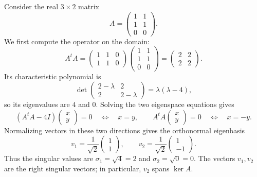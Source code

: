 \begin{example}
Consider the real \(3\times2\) matrix
\[
A=\begin{pmatrix}1&1\\1&1\\0&0\end{pmatrix}.
\]
We first compute the operator on the domain:
\[
A^tA
=\begin{pmatrix}1&1&0\\1&1&0\end{pmatrix}
\begin{pmatrix}1&1\\1&1\\0&0\end{pmatrix}
=\begin{pmatrix}2&2\\2&2\end{pmatrix}.
\]
Its characteristic polynomial is
\[
\det\begin{pmatrix}2-\lambda&2\\2&2-\lambda\end{pmatrix}
=\lambda(\lambda-4),
\]
so its eigenvalues are \(4\) and \(0\).  Solving the two eigenspace
equations gives
\[
(A^tA-4I)\begin{pmatrix}x\\y\end{pmatrix}=0
\quad\Longleftrightarrow\quad x=y,
\qquad
A^tA\begin{pmatrix}x\\y\end{pmatrix}=0
\quad\Longleftrightarrow\quad x=-y.
\]
Normalizing vectors in these two directions gives the orthonormal eigenbasis
\[
v_1=\frac1{\sqrt2}\begin{pmatrix}1\\1\end{pmatrix},
\qquad
v_2=\frac1{\sqrt2}\begin{pmatrix}1\\-1\end{pmatrix}.
\]
Thus the singular values are \(\sigma_1=\sqrt4=2\) and
\(\sigma_2=\sqrt0=0\).  The vectors \(v_1,v_2\) are the right singular
vectors; in particular, \(v_2\) spans \(\ker A\).


\end{example}
